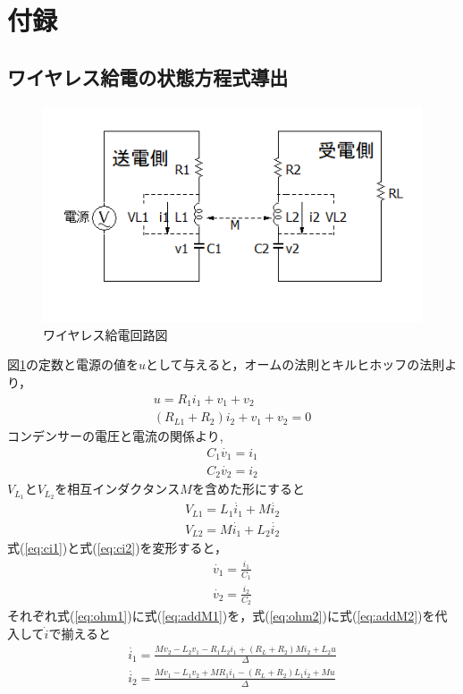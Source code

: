 \documentclass[12pt]{jarticle}
\begin{document}
\section{付録}
\subsection{ワイヤレス給電の状態方程式導出}
\begin{figure}[h]
	\centering
	\includegraphics[]{wpt_2020128.png}
	\caption{ワイヤレス給電回路図}
	\label{fig:wpt_kairo2}
\end{figure}
図\ref{fig:wpt_kairo2}の定数と電源の値を$u$として与えると，オームの法則とキルヒホッフの法則より，
\setcounter{equation}{0}
\begin{eqnarray}
\label{eq:ohm1}
u=R_1i_1+v_1+v_2\\
\label{eq:ohm2}
(R_{L1}+R_2)i_2+v_1+v_2=0
\end{eqnarray}
 コンデンサーの電圧と電流の関係より,
\begin{eqnarray}
\label{eq:ci1}
C_1\dot{v_1}=i_1\\
\label{eq:ci2}
C_2\dot{v_2}=i_2
\end{eqnarray}
$V_{L_1}とV_{L_2}を相互インダクタンスMを含めた形にすると$
\begin{eqnarray}
\label{eq:addM1}
V_{L1}=L_1\dot{i_1}+M\dot{i_2}\\
\label{eq:addM2}
V_{L2}=M\dot{i_1}+L_2\dot{i_2}
\end{eqnarray}
式(\ref{eq:ci1})と式(\ref{eq:ci2})を変形すると，
\begin{eqnarray}
\dot{v_1}=\frac{i_1}{C_1}\\
\dot{v_2}=\frac{i_2}{C_2}
\end{eqnarray}
それぞれ式(\ref{eq:ohm1})に式(\ref{eq:addM1})を，式(\ref{eq:ohm2})に式(\ref{eq:addM2})を代入して$\dot{i}$で揃えると
\begin{eqnarray}
\label{eq:doti1}
\dot{i_1}=\frac{Mv_2-L_2v_1-R_1L_2i_1+(R_L+R_2)Mi_2+L_2u}{\Delta}\\
\label{eq:doti2}
\dot{i_2}=\frac{Mv_1-L_1v_2+MR_1i_1-(R_L+R_2)L_1i_2+Mu}{\Delta}
\end{eqnarray}
\end{document}

